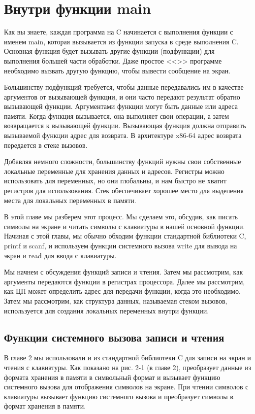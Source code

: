 
\chapter{Внутри функции main}

Как вы знаете, каждая программа на C начинается с выполнения функции с именем main, которая вызывается из функции запуска в среде выполнения C. Основная функция будет вызывать другие функции (подфункции) для выполнения большей части обработки. Даже простое <<>> программе необходимо вызвать другую функцию, чтобы вывести сообщение на экран.

Большинству подфункций требуется, чтобы данные передавались им в качестве аргументов от вызывающей функции, и они часто передают результат обратно вызывающей функции. Аргументами функции могут быть данные или адреса памяти. Когда функция вызывается, она выполняет свои операции, а затем возвращается к вызывающей функции. Вызывающая функция должна отправить вызываемой функции адрес для возврата. В архитектуре x86-64 адрес возврата передается в стеке вызовов.

Добавляя немного сложности, большинству функций нужны свои собственные локальные переменные для хранения данных и адресов. Регистры можно использовать для переменных, но они глобальны, и нам быстро не хватит регистров для использования. Стек обеспечивает хорошее место для выделения места для локальных переменных в памяти.

В этой главе мы разберем этот процесс. Мы сделаем это, обсудив, как писать символы на экране и читать символы с клавиатуры в нашей основной функции. Начиная с этой главы, мы обычно обходим функции стандартной библиотеки C, printf и scanf, и используем функции системного вызова write для вывода на экран и read для ввода с клавиатуры.

Мы начнем с обсуждения функций записи и чтения. Затем мы рассмотрим, как аргументы передаются функции в регистрах процессора. Далее мы рассмотрим, как ЦП может определить адрес для передачи функции, когда это необходимо. Затем мы рассмотрим, как структура данных, называемая стеком вызовов, используется для создания локальных переменных внутри функции.

\section{Функции системного вызова записи и чтения}

В главе 2 мы использовали  и  из стандартной библиотеки C для записи на экран и чтения с клавиатуры. Как показано на рис. 2-1 (в главе 2),  преобразует данные из формата хранения в памяти в символьный формат и вызывает функцию системного вызова  для отображения символов на экране. При чтении символов с клавиатуры  вызывает функцию системного вызова  и преобразует символы в формат хранения в памяти.

